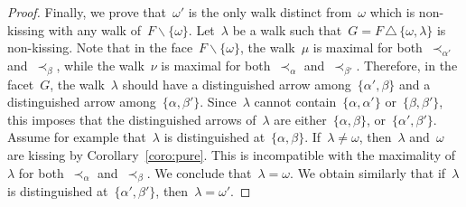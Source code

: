 \documentclass{memo-l}
\theoremstyle{definition}
\newcommand{\ssm}{\smallsetminus} %
\newcommand{\symdif}{\,\triangle\,} %
\begin{document}
\begin{proof}
Finally, we prove that~$\omega'$ is the only walk distinct from~$\omega$ which is non-kissing with any walk of~$F \ssm \{\omega\}$.
Let~$\lambda$ be a walk such that~$G = F \symdif \{\omega, \lambda\}$ is non-kissing.
Note that in the face~$F \ssm \{\omega\}$, the walk~$\mu$ is maximal for both~$\prec_{\alpha'}$ and~$\prec_\beta$, while the walk~$\nu$ is maximal for both~$\prec_\alpha$ and~$\prec_{\beta'}$.
Therefore, in the facet~$G$, the walk~$\lambda$ should have a distinguished arrow among~$\{\alpha', \beta\}$ and a distinguished arrow among~$\{\alpha, \beta'\}$.
Since~$\lambda$ cannot contain~$\{\alpha, \alpha'\}$ or~$\{\beta, \beta'\}$, this imposes that the distinguished arrows of~$\lambda$ are either~$\{\alpha, \beta\}$, or~$\{\alpha', \beta'\}$.
Assume for example that~$\lambda$ is distinguished at~$\{\alpha, \beta\}$.
If~$\lambda \ne \omega$, then~$\lambda$ and~$\omega$ are kissing by Corollary~\ref{coro:pure}.
This is incompatible with the maximality of~$\lambda$ for both~$\prec_\alpha$ and~$\prec_\beta$.
We conclude that~$\lambda = \omega$.
We obtain similarly that if~$\lambda$ is distinguished at~$\{\alpha', \beta'\}$, then~$\lambda = \omega'$.
\end{proof}
\end{document}
